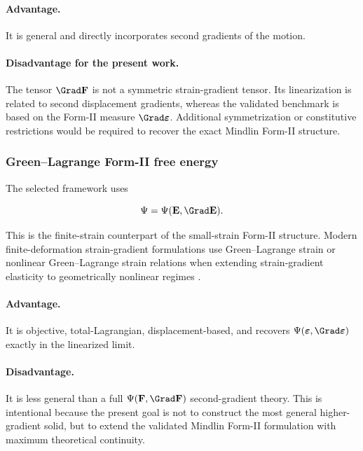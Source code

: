 \documentclass[11pt]{article}
\begin{document}
\paragraph{Advantage.}
It is general and directly incorporates second gradients of the motion.

\paragraph{Disadvantage for the present work.}
The tensor $\Grad\mathbf{F}$ is not a symmetric strain-gradient tensor. Its linearization is related to second displacement gradients, whereas the validated benchmark is based on the Form-II measure $\Grad\bm{\varepsilon}$. Additional symmetrization or constitutive restrictions would be required to recover the exact Mindlin Form-II structure.

\subsubsection{Green--Lagrange Form-II free energy}

The selected framework uses

\begin{equation}
\Psi=\Psi(\mathbf{E},\Grad\mathbf{E}).
\label{eq:sec2_green_lagrange_formII}
\end{equation}

This is the finite-strain counterpart of the small-strain Form-II structure. Modern finite-deformation strain-gradient formulations use Green--Lagrange strain or nonlinear Green--Lagrange strain relations when extending strain-gradient elasticity to geometrically nonlinear regimes \cite{Beheshti2016,Beheshti2017,TorabiNiiranenAnsari2021,AbaliMullerEremeyev2015}.

\paragraph{Advantage.}
It is objective, total-Lagrangian, displacement-based, and recovers $\Psi(\bm{\varepsilon},\Grad\bm{\varepsilon})$ exactly in the linearized limit.

\paragraph{Disadvantage.}
It is less general than a full $\Psi(\mathbf{F},\Grad\mathbf{F})$ second-gradient theory. This is intentional because the present goal is not to construct the most general higher-gradient solid, but to extend the validated Mindlin Form-II formulation with maximum theoretical continuity.
\end{document}
